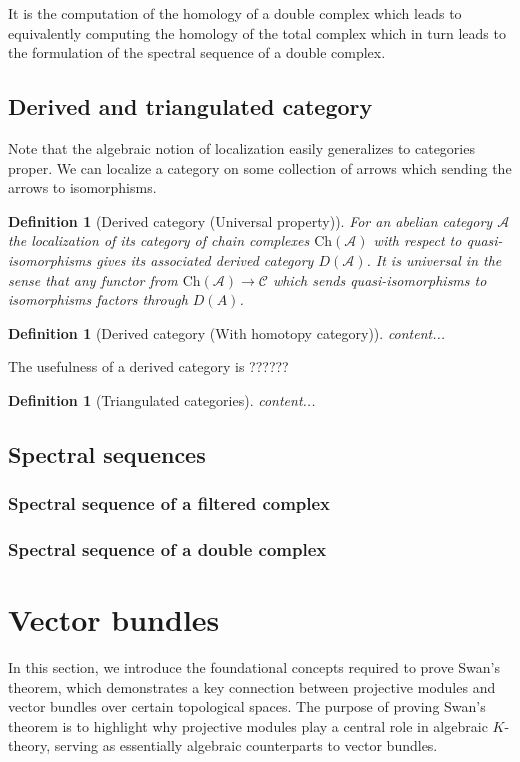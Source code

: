 \documentclass[12pt]{report}
\numberwithin{equation}{section}
\newtheorem{definition}[dummy]{Definition}
\begin{document}
	It is the computation of the homology of a double complex which leads to equivalently computing the homology of the total complex which in turn leads to the formulation of the spectral sequence of a double complex.
	
	\section{Derived and triangulated category}
	
	Note that the algebraic notion of localization easily generalizes to categories proper. We can localize a category on some collection of arrows which sending the arrows to isomorphisms.
	
	\begin{definition}[Derived category (Universal property)]
		For an abelian category $\mathcal{A}$ the localization of its category of chain complexes $\mathrm{Ch}(\mathcal{A})$ with respect to quasi-isomorphisms gives its associated derived category $D(\mathcal{A})$. It is universal in the sense that any functor from $\mathrm{Ch}(\mathcal{A}) \to \mathcal{C}$ which sends quasi-isomorphisms to isomorphisms factors through $D(A)$.
	\end{definition}
	
	\begin{definition}[Derived category (With homotopy category)]
		content...
	\end{definition}
	
	The usefulness of a derived category is ??????
	
	\begin{definition}[Triangulated categories]
		content...
	\end{definition}
	
	\section{Spectral sequences}
	\subsection{Spectral sequence of a filtered complex}
	
	\subsection{Spectral sequence of a double complex}
	
	

		\chapter{Vector bundles}
	 In this section, we introduce the foundational concepts required to prove Swan's theorem, which demonstrates a key connection between projective modules and vector bundles over certain topological spaces. The purpose of proving Swan's theorem is to highlight why projective modules play a central role in algebraic $K$-theory, serving as essentially algebraic counterparts to vector bundles.
	
\end{document}

